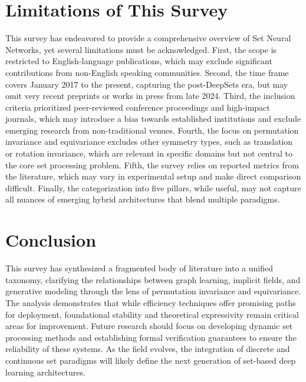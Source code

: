 \documentclass{article}
\begin{document}
\section{Limitations of This Survey}

\label{sec:limitations_of_this_survey}

This survey has endeavored to provide a comprehensive overview of Set Neural Networks, yet several limitations must be acknowledged. First, the scope is restricted to English-language publications, which may exclude significant contributions from non-English speaking communities. Second, the time frame covers January 2017 to the present, capturing the post-DeepSets era, but may omit very recent preprints or works in press from late 2024. Third, the inclusion criteria prioritized peer-reviewed conference proceedings and high-impact journals, which may introduce a bias towards established institutions and exclude emerging research from non-traditional venues. Fourth, the focus on permutation invariance and equivariance excludes other symmetry types, such as translation or rotation invariance, which are relevant in specific domains but not central to the core set processing problem. Fifth, the survey relies on reported metrics from the literature, which may vary in experimental setup and make direct comparison difficult. Finally, the categorization into five pillars, while useful, may not capture all nuances of emerging hybrid architectures that blend multiple paradigms.

\section{Conclusion}

\label{sec:conclusion}

This survey has synthesized a fragmented body of literature into a unified taxonomy, clarifying the relationships between graph learning, implicit fields, and generative modeling through the lens of permutation invariance and equivariance. The analysis demonstrates that while efficiency techniques offer promising paths for deployment, foundational stability and theoretical expressivity remain critical areas for improvement. Future research should focus on developing dynamic set processing methods and establishing formal verification guarantees to ensure the reliability of these systems. As the field evolves, the integration of discrete and continuous set paradigms will likely define the next generation of set-based deep learning architectures.
\end{document}
